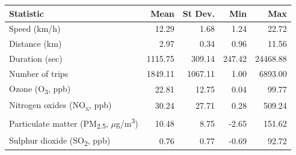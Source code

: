 \begin{tabular}{lrrrr}
\toprule
Statistic & Mean & St Dev. & Min & Max \\
\midrule
Speed (km/h) & 12.29 & 1.68 & 1.24 & 22.72 \\
Distance (km) & 2.97 & 0.34 & 0.96 & 11.56 \\
Duration (sec) & 1115.75 & 309.14 & 247.42 & 24468.88 \\
Number of trips & 1849.11 & 1067.11 & 1.00 & 6893.00 \\
Ozone (O\textsubscript{3}, ppb) & 22.81 & 12.75 & 0.04 & 99.77 \\
Nitrogen oxides (NO\textsubscript{x}, ppb) & 30.24 & 27.71 & 0.28 & 509.24 \\
Particulate matter (PM\textsubscript{2.5}, $\mu$g/m\textsuperscript{3}) & 10.48 & 8.75 & -2.65 & 151.62 \\
Sulphur dioxide (SO\textsubscript{2}, ppb) & 0.76 & 0.77 & -0.69 & 92.72 \\
\bottomrule
\end{tabular}
